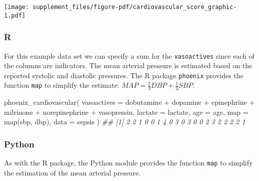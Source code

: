 \documentclass[
  letterpaper,
  DIV=11,
  numbers=noendperiod]{scrartcl}
\newenvironment{Shaded}{\begin{snugshade}}{\end{snugshade}}
\newcommand{\AttributeTok}[1]{\textcolor[rgb]{0.40,0.45,0.13}{#1}}
\newcommand{\DocumentationTok}[1]{\textcolor[rgb]{0.37,0.37,0.37}{\textit{#1}}}
\newcommand{\FunctionTok}[1]{\textcolor[rgb]{0.28,0.35,0.67}{#1}}
\newcommand{\NormalTok}[1]{\textcolor[rgb]{0.00,0.23,0.31}{#1}}
\newcommand{\SpecialCharTok}[1]{\textcolor[rgb]{0.37,0.37,0.37}{#1}}
\begin{document}
\texttt{[image: supplement\_files/figure-pdf/cardiovascular\_score\_graphic-1.pdf]}

\subsubsection{R}\label{r-3}

For this example data set we can specify a sum for the
\texttt{vasoactives} since each of the columns are indicators. The mean
arterial pressure is estimated based on the reported systolic and
diastolic pressures. The R package \texttt{phoenix} provides the
function \texttt{map} to simplify the estimate:
\(MAP = \frac{2}{3}DBP + \frac{1}{3}SBP\).

\begin{Shaded}
\begin{Highlighting}[]
\FunctionTok{phoenix\_cardiovascular}\NormalTok{(}
  \AttributeTok{vasoactives =}\NormalTok{ dobutamine }\SpecialCharTok{+}\NormalTok{ dopamine }\SpecialCharTok{+}\NormalTok{ epinephrine }\SpecialCharTok{+}
\NormalTok{                milrinone }\SpecialCharTok{+}\NormalTok{ norepinephrine }\SpecialCharTok{+}\NormalTok{ vasopressin,}
  \AttributeTok{lactate =}\NormalTok{ lactate,}
  \AttributeTok{age =}\NormalTok{ age,}
  \AttributeTok{map =} \FunctionTok{map}\NormalTok{(sbp, dbp),}
  \AttributeTok{data =}\NormalTok{ sepsis}
\NormalTok{)}
\DocumentationTok{\#\#  [1] 2 2 1 0 0 1 4 0 3 0 3 0 0 2 3 2 2 2 2 1}
\end{Highlighting}
\end{Shaded}

\subsubsection{Python}\label{python-3}

As with the R package, the Python module provides the function
\texttt{map} to simplify the estimation of the mean arterial pressure.
\end{document}
